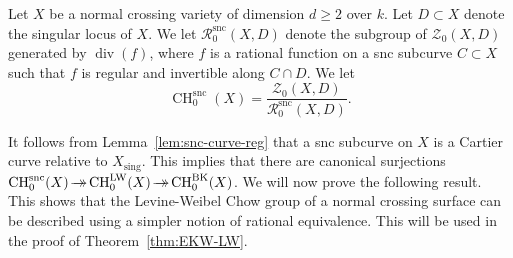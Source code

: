 \documentclass[JEP,XML,SOM,Unicode,published]{cedram}
\let\mathcal\mathscr
\newcommand{\onto}{\mathchoice{\to\hspace*{-5mm}\to}{\hspace*{-.5mm}\to\hspace*{-2.85mm}\to\hspace*{-.5mm}}{\to\hspace*{-3mm}\to}{\to\hspace*{-3mm}\to}}
\let\surj\onto
\newcommand{\snc}{\mathrm{snc}}
\newcommand{\BK}{\mathrm{BK}}
\newcommand{\LW}{\mathrm{LW}}
\theoremstyle{definition}
\newcommand{\thmref}{Theorem~\ref}
\newcommand{\lemref}{Lemma~\ref}
\newcommand{\sR}{{\mathcal R}}
\newcommand{\sZ}{{\mathcal Z}}
\DeclareMathOperator{\CH}{CH}
\DeclareMathOperator{\divf}{div}
\newcommand{\sing}{\mathrm{sing}}
\begin{document}
Let $X$ be a normal crossing variety of dimension $d \ge 2$ over $k$.
Let $D \subset X$ denote the singular locus of $X$. We let
$\sR^{\snc}_0(X,D)$ denote the subgroup of $\sZ_0(X,D)$ generated by
$\divf(f)$, where $f$ is a rational function on a snc subcurve
$C \subset X$ such that $f$ is regular and invertible along $C \cap D$.
We let
\begin{equation}\label{eqn:snc-Chow}
\CH^{\snc}_0(X) = \frac{\sZ_0(X,D)}{\sR^{\snc}_0(X,D)}.
\end{equation}

It follows from \lemref{lem:snc-curve-reg} that a snc subcurve on $X$ is
a Cartier curve relative to $X_{\sing}$. This implies that there are
canonical surjections $\CH^{\snc}_0(X) \surj \CH^{\LW}_0(X) \surj \CH_0^{\BK}(X)$.
We will now prove the following result.
This shows that the Levine-Weibel Chow group of a normal crossing surface
can be described using a simpler notion of rational equivalence.
This will be used in the proof of \thmref{thm:EKW-LW}.
\end{document}
